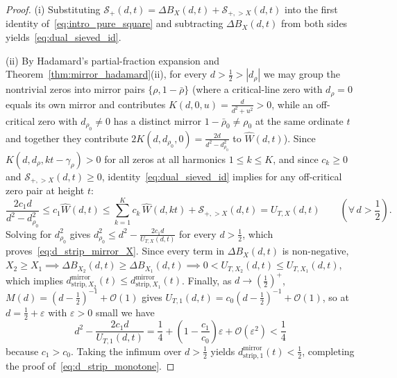 \documentclass[11pt,reqno]{amsart}
\theoremstyle{definition}
\theoremstyle{remark}
\numberwithin{equation}{section}
\begin{document}
\begin{proof}
(i) Substituting $\mathcal{S}_+(d,t) = \Delta B_X(d,t) + \mathcal{S}_{+,>X}(d,t)$ into the first identity of~\eqref{eq:intro_pure_square} and subtracting $\Delta B_X(d,t)$ from both sides yields~\eqref{eq:dual_sieved_id}.

(ii) By Hadamard's partial-fraction expansion and Theorem~\ref{thm:mirror_hadamard}(ii), for every $d > \frac{1}{2} > |d_\rho|$ we may group the nontrivial zeros into mirror pairs $\{\rho, 1 - \bar{\rho}\}$ (where a critical-line zero with $d_\rho = 0$ equals its own mirror and contributes $K(d,0,u) = \frac{d}{d^2+u^2} > 0$, while an off-critical zero with $d_{\rho_0} \neq 0$ has a distinct mirror $1 - \bar{\rho}_0 \neq \rho_0$ at the same ordinate $t$ and together they contribute $2K(d, d_{\rho_0}, 0) = \frac{2d}{d^2 - d_{\rho_0}^2}$ to $\widehat{W}(d,t)$). Since $K(d, d_\rho, kt - \gamma_\rho) > 0$ for all zeros at all harmonics $1 \le k \le K$, and since $c_k \ge 0$ and $\mathcal{S}_{+,>X}(d,t) \ge 0$, identity~\eqref{eq:dual_sieved_id} implies for any off-critical zero pair at height $t$:
\[
\frac{2c_1 d}{d^2 - d_{\rho_0}^2} \le c_1\widehat{W}(d,t) \le \sum_{k=1}^K c_k\,\widehat{W}(d,kt) + \mathcal{S}_{+,>X}(d,t) = U_{T,X}(d,t) \qquad \left(\forall\,d > \frac{1}{2}\right).
\]
Solving for $d_{\rho_0}^2$ gives $d_{\rho_0}^2 \le d^2 - \frac{2c_1 d}{U_{T,X}(d,t)}$ for every $d > \frac{1}{2}$, which proves~\eqref{eq:d_strip_mirror_X}. Since every term in $\Delta B_X(d,t)$ is non-negative, $X_2 \ge X_1 \implies \Delta B_{X_2}(d,t) \ge \Delta B_{X_1}(d,t) \implies 0 < U_{T,X_2}(d,t) \le U_{T,X_1}(d,t)$, which implies $d_{\mathrm{strip},X_2}^{\mathrm{mirror}}(t) \le d_{\mathrm{strip},X_1}^{\mathrm{mirror}}(t)$. Finally, as $d \to (\frac{1}{2})^+$, $M(d) = (d - \frac{1}{2})^{-1} + \mathcal{O}(1)$ gives $U_{T,1}(d,t) = c_0(d - \frac{1}{2})^{-1} + \mathcal{O}(1)$, so at $d = \frac{1}{2} + \varepsilon$ with $\varepsilon > 0$ small we have
\[
d^2 - \frac{2c_1 d}{U_{T,1}(d,t)} = \frac{1}{4} + \left(1 - \frac{c_1}{c_0}\right)\varepsilon + \mathcal{O}(\varepsilon^2) < \frac{1}{4}
\]
because $c_1 > c_0$. Taking the infimum over $d > \frac{1}{2}$ yields $d_{\mathrm{strip},1}^{\mathrm{mirror}}(t) < \frac{1}{2}$, completing the proof of~\eqref{eq:d_strip_monotone}.
\end{proof}
\end{document}
